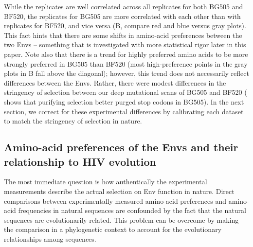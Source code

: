 \documentclass[9pt]{elife}
\begin{document}
While the replicates are well correlated across all replicates for both BG505 and BF520, the replicates for BG505 are more correlated with each other than with replicates for BF520, and vice versa (B, compare red and blue versus gray plots).
This fact hints that there are some shifts in amino-acid preferences between the two Envs -- something that is investigated with more statistical rigor later in this paper.
Note also that there is a trend for highly preferred amino acids to be more strongly preferred in BG505 than BF520 (most high-preference points in the gray plots in B fall above the diagonal); however, this trend does not necessarily reflect differences between the Envs.
Rather, there were modest differences in the stringency of selection between our deep mutational scans of BG505 and BF520 ( shows that purifying selection better purged stop codons in BG505).
In the next section, we correct for these experimental differences by calibrating each dataset to match the stringency of selection in nature.

\subsection{Amino-acid preferences of the Envs and their relationship to HIV evolution}
The most immediate question is how authentically the experimental measurements describe the actual selection on Env function in nature.
Direct comparisons between experimentally measured amino-acid preferences and amino-acid frequencies in natural sequences are confounded by the fact that the natural sequences are evolutionarily related.
This problem can be overcome by making the comparison in a phylogenetic context to account for the evolutionary relationships among sequences.
\end{document}
